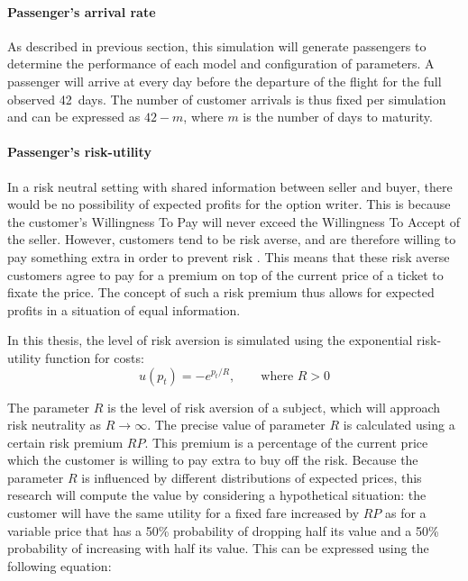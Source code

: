 
\paragraph{Passenger's arrival rate}
As described in previous section, this simulation will generate passengers to determine the performance of each model and configuration of parameters. A passenger will arrive at every day before the departure of the flight for the full observed 42~days. The number of customer arrivals is thus fixed per simulation and can be expressed as $42 - m$, where $m$ is the number of days to maturity.

\paragraph{Passenger's risk-utility}
In a risk neutral setting with shared information between seller and buyer, there would be no possibility of expected profits for the option writer. This is because the customer's Willingness To Pay will never exceed the Willingness To Accept of the seller. However, customers tend to be risk averse, and are therefore willing to pay something extra in order to prevent risk . This means that these risk averse customers agree to pay for a premium on top of the current price of a ticket to fixate the price. The concept of such a risk premium thus allows for expected profits in a situation of equal information.

In this thesis, the level of risk aversion is simulated using the exponential risk-utility function for costs:
$$
u(p_t) = -e^{p_t/R},\hspace{2em}\text{where } R > 0
$$

The parameter $R$ is the level of risk aversion of a subject, which will approach risk neutrality as $R \rightarrow \infty$. The precise value of parameter $R$ is calculated using a certain risk premium $RP$. This premium is a percentage of the current price which the customer is willing to pay extra to buy off the risk. Because the parameter $R$ is influenced by different distributions of expected prices, this research will compute the value by considering a hypothetical situation: the customer will have the same utility for a fixed fare increased by $RP$ as for a variable price that has a 50\% probability of dropping half its value and a 50\% probability of increasing with half its value. This can be expressed using the following equation: 

